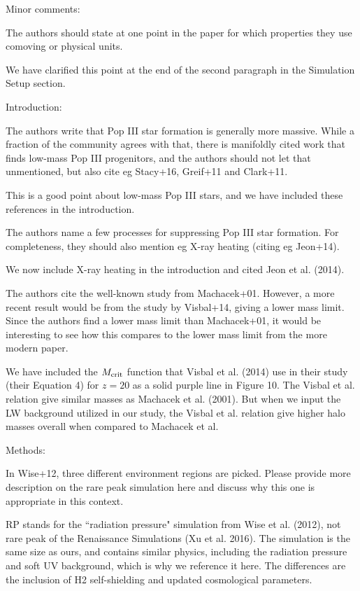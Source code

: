 \documentclass[11pt]{article}
\newenvironment{referee}[1][]{%
    \ignorespaces%
    \begin{mdframed}[style=myquotestyle,#1]%
}{%
    \end{mdframed}%
    \ignorespacesafterend%
}%
\begin{document}
\begin{referee}
Minor comments:

The authors should state at one point in the paper for which properties they use comoving or physical units.
\end{referee}
We have clarified this point at the end of the second paragraph in the Simulation Setup section.

\begin{referee}
Introduction:

The authors write that Pop III star formation is generally more massive. While a fraction of the community agrees with that, there is manifoldly cited work that finds low-mass Pop III progenitors, and the authors should not let that unmentioned, but also cite eg Stacy+16, Greif+11 and Clark+11.
\end{referee}
This is a good point about low-mass Pop III stars, and we have included these references in the introduction.

\begin{referee}
The authors name a few processes for suppressing Pop III star formation. For completeness, they should also mention eg X-ray heating (citing eg Jeon+14).
\end{referee}
We now include X-ray heating in the introduction and cited Jeon et al. (2014).

\begin{referee}
The authors cite the well-known study from Machacek+01. However, a more recent result would be from the study by Visbal+14, giving a lower mass limit. Since the authors find a lower mass limit than Machacek+01, it would be interesting to see how this compares to the lower mass limit from the more modern paper.
\end{referee}
We have included the $M_{\rm crit}$ function that Visbal et al. (2014) use in their study (their Equation 4) for $z=20$ as a solid purple line in Figure 10. The Visbal et al. relation give similar masses as Machacek et al. (2001).  But when we input the LW background utilized in our study, the Visbal et al. relation give higher halo masses overall when compared to Machacek et al.

\begin{referee}
Methods:

In Wise+12, three different environment regions are picked. Please provide more description on the rare peak simulation here and discuss why this one is appropriate in this context.
\end{referee}
RP stands for the ``radiation pressure" simulation from Wise et al. (2012), not rare peak of the Renaissance Simulations (Xu et al. 2016). The simulation is the same size as ours, and contains similar physics, including the radiation pressure and soft UV background, which is why we reference it here. The differences are the inclusion of H2 self-shielding and updated cosmological parameters.
 
\end{document}
